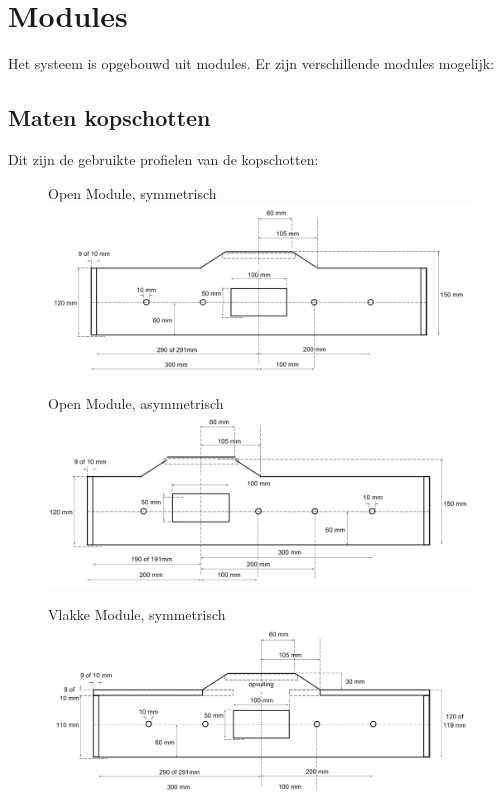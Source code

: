 \documentclass[12pt,a4paper]{report}
\begin{document}
\chapter{Modules}
\label{ch:modules}
Het systeem is opgebouwd uit modules. Er zijn verschillende modules mogelijk:

\section{Maten kopschotten}

Dit zijn de gebruikte profielen van de kopschotten:

\begin{figure}[ht]
  \captionbox
  {Open Module, symmetrisch}
  {\includegraphics[scale=0.25]{images/rcu_open_sym}}
\end{figure}

\begin{figure}[ht]
  \captionbox
  {Open Module, asymmetrisch}
  {\includegraphics[scale=0.25]{images/rcu_open_asym}}
\end{figure}

\begin{figure}[ht]
  \captionbox
  {Vlakke Module, symmetrisch}
  {\includegraphics[scale=0.25]{images/rcu_vlak_sym}}
\end{figure}
\end{document}
